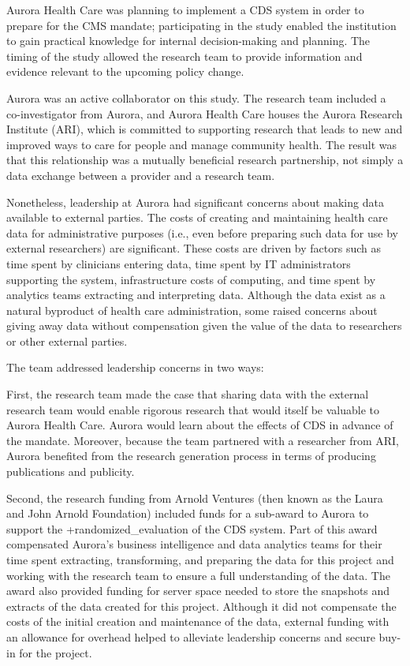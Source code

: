 \documentclass[
]{book}
\begin{document}
Aurora Health Care was planning to implement a CDS system in order to prepare for the CMS mandate; participating in the study enabled the institution to gain practical knowledge for internal decision-making and planning. The timing of the study allowed the research team to provide information and evidence relevant to the upcoming policy change.

Aurora was an active collaborator on this study. The research team included a co-investigator from Aurora, and Aurora Health Care houses the Aurora Research Institute (ARI), which is committed to supporting research that leads to new and improved ways to care for people and manage community health. The result was that this relationship was a mutually beneficial research partnership, not simply a data exchange between a provider and a research team.

Nonetheless, leadership at Aurora had significant concerns about making data available to external parties. The costs of creating and maintaining health care data for administrative purposes (i.e., even before preparing such data for use by external researchers) are significant. These costs are driven by factors such as time spent by clinicians entering data, time spent by IT administrators supporting the system, infrastructure costs of computing, and time spent by analytics teams extracting and interpreting data. Although the data exist as a natural byproduct of health care administration, some raised concerns about giving away data without compensation given the value of the data to researchers or other external parties.

The team addressed leadership concerns in two ways:

First, the research team made the case that sharing data with the external research team would enable rigorous research that would itself be valuable to Aurora Health Care. Aurora would learn about the effects of CDS in advance of the mandate. Moreover, because the team partnered with a researcher from ARI, Aurora benefited from the research generation process in terms of producing publications and publicity.

Second, the research funding from Arnold Ventures (then known as the Laura and John Arnold Foundation) included funds for a sub-award to Aurora to support the +randomized\_evaluation\textbar{} of the CDS system. Part of this award compensated Aurora's business intelligence and data analytics teams for their time spent extracting, transforming, and preparing the data for this project and working with the research team to ensure a full understanding of the data. The award also provided funding for server space needed to store the snapshots and extracts of the data created for this project. Although it did not compensate the costs of the initial creation and maintenance of the data, external funding with an allowance for overhead helped to alleviate leadership concerns and secure buy-in for the project.
\end{document}
